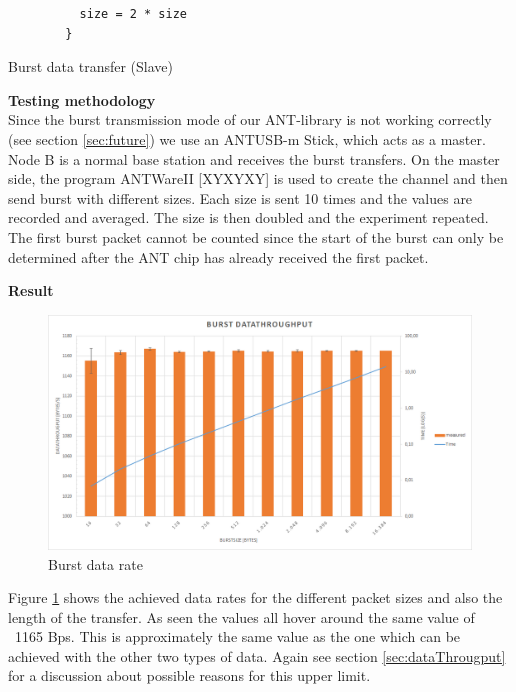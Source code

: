 \begin{description}
\begin{code}[H]
\begin{verbatim}
		  size = 2 * size
		}
		\end{verbatim}
		\caption{Burst data transfer (Slave)}\label{lst:sExp5}
	\end{code}
	\item{\textbf{Testing methodology}} \hfill \\ Since the burst transmission mode of our ANT-library is not working correctly (see section \ref{sec:future}) we use an ANTUSB-m Stick, which acts as a master. Node B is a normal base station and receives the burst transfers. On the master side, the program ANTWareII [XYXYXY] is used to create the channel and then send burst with different sizes. Each size is sent 10 times and the values are recorded and averaged. The size is then doubled and the experiment repeated. The first burst packet cannot be counted since the start of the burst can only be determined after the ANT chip has already received the first packet.
	\item{\textbf{Result}} \hfill \\ 
		\begin{figure}[H]
			\centering
			\includegraphics[scale=0.5]{./pics/exp5.png}
			\caption{Burst data rate}\label{fig:exp5}
		\end{figure}
	 Figure \ref{fig:exp5} shows the achieved data rates for the different packet sizes and also the length of the transfer. As seen the values all hover around the same value of ~1165 Bps. This is approximately the same value as the one which can be achieved with the other two types of data.
	 Again see section \ref{sec:dataThrougput} for a discussion about possible reasons for this upper limit. 
\end{description}
\newpage

